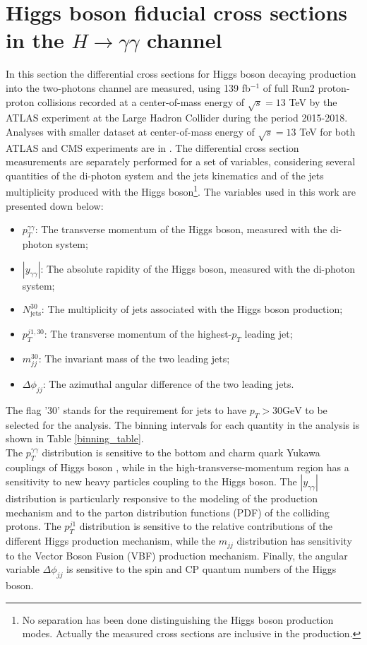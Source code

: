 \chapter{Higgs boson fiducial cross sections in the $H \rightarrow \gamma\gamma$ channel}
\label{capitolo_5}
In this section the differential cross sections for Higgs boson decaying production into the two-photons channel are measured, using 139 fb$^{-1}$ of full Run2 proton-proton collisions recorded at a center-of-mass energy of $\sqrt{s} = 13$ TeV by the ATLAS experiment at the Large Hadron Collider during the period 2015-2018. Analyses with smaller dataset at center-of-mass energy of $\sqrt{s} = 13$ TeV for both ATLAS and CMS experiments are in \cite{Aaboud_measurements, collaboration2018MeasurementAI}. The differential cross section measurements are separately performed for a set of variables, considering several quantities of the di-photon system and the jets kinematics and of the jets multiplicity produced with the Higgs boson\footnote{No separation has been done distinguishing the Higgs boson production modes. Actually the measured cross sections are inclusive in the production.}. 
The variables used in this work are presented down below:
\begin{itemize}
\item $p_T^{\gamma\gamma}$: The transverse momentum of the Higgs boson, measured with the di-photon system;
\item $|y_{\gamma\gamma}|$: The absolute rapidity of the Higgs boson, measured with the di-photon system;
\item $N_{\text{jets}}^{30}$: The multiplicity of jets associated with the Higgs boson production;
\item $p_T^{j1, 30}$: The transverse momentum of the highest-$p_T$ leading jet;
\item $m_{jj}^{30}$: The invariant mass of the two leading jets;
\item $\Delta \phi_{jj}$: The azimuthal angular difference of the two leading jets.
\end{itemize}
The flag '$30$' stands for the requirement for jets to have $p_T > 30 \text{GeV}$ to be selected for the analysis. The binning intervals for each quantity in the analysis is shown in Table \ref{binning_table}.
\\
The $p_T^{\gamma\gamma}$ distribution is sensitive to the bottom and charm quark Yukawa couplings of Higgs boson \cite{Bishara_2017}, while in the high-transverse-momentum region has a sensitivity to new heavy particles coupling to the Higgs boson. The $|y_{\gamma\gamma}|$ distribution is particularly responsive to the modeling of the production mechanism and to the parton distribution functions (PDF) of the colliding protons. The $p_T^{j1}$ distribution is sensitive  to the relative contributions of the different Higgs production mechanism, while the $m_{jj}$ distribution has sensitivity to the Vector Boson Fusion (VBF) production mechanism. Finally, the angular variable $\Delta \phi_{jj}$ is sensitive to the spin and CP quantum numbers of the Higgs boson.
